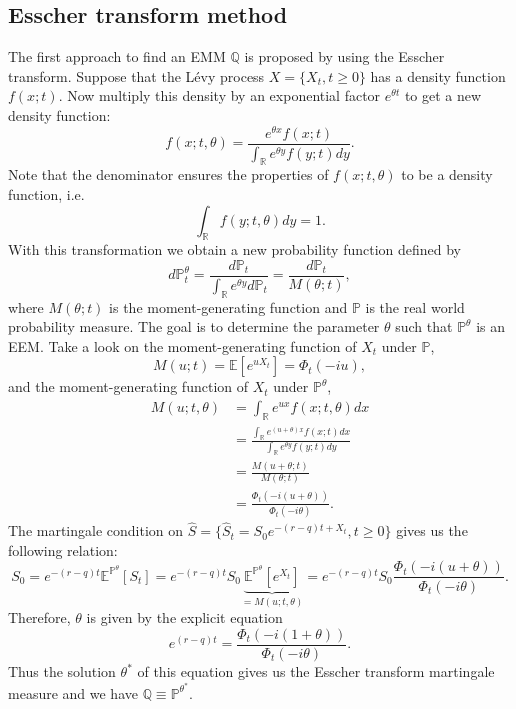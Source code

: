 \subsection{Esscher transform method}
The first approach to find an EMM $\mathbb{Q}$ is proposed by \citeauthor{G+94} \citeyearpar{G+94} using the Esscher transform. Suppose that the L\'evy process $X=\{X_t,t\geq0\}$ has a density function $f(x;t)$. Now multiply this density by an exponential factor $e^{\theta t}$ to get a new density function:
$$f(x;t,\theta) = \frac{e^{\theta x}f(x;t)}{\int_{\mathbb{R}}e^{\theta y}f(y;t)dy}.$$
Note that the denominator ensures the properties of $f(x;t,\theta)$ to be a density function, i.e.
$$\int_\mathbb{R}f(y;t,\theta)dy = 1.$$
With this transformation we obtain a new probability function defined by
$$d\mathbb{P}^{\theta}_t = \frac{d\mathbb{P}_t}{\int_\mathbb{R}e^{\theta y} d\mathbb{P}_t} = \frac{d\mathbb{P}_t}{M(\theta;t)},$$
where $M(\theta;t)$ is the moment-generating function and $\mathbb{P}$ is the real world probability measure. The goal is to determine the parameter $\theta$ such that $\mathbb{P}^{\theta}$ is an EEM.
Take a look on the moment-generating function of $X_t$ under $\mathbb{P}$,
$$M(u;t) = \mathbb{E}\left[e^{u X_t}\right]=\Phi_t(-iu),$$
and the moment-generating function of $X_t$ under $\mathbb{P}^{\theta}$,
\begin{align}\label{eq:CF_theta}
M(u;t,\theta) &= \int_\mathbb{R} e^{u x}f(x;t,\theta)dx\nonumber\\
&=\frac{\int_\mathbb{R} e^{(u+\theta)x}f(x;t) dx}{\int_\mathbb{R} e^{\theta y}f(y;t)dy}\nonumber\\
&= \frac{M(u+\theta;t)}{M(\theta;t)}\nonumber\\
&=\frac{\Phi_t(-i(u+\theta))}{\Phi_t(-i\theta)}.
\end{align}
The martingale condition on $\hat{S}=\{\hat{S}_t=S_0e^{-(r-q)t+X_t},t\geq0\}$ gives us the following relation:
$$S_0 = e^{-(r-q)t}\mathbb{E}^{\mathbb{P}^\theta}\left[S_t\right]=e^{-(r-q)t}S_0\underbrace{\mathbb{E}^{\mathbb{P}^\theta}\left[e^{X_t}\right]}_{=M(u;t,\theta)}=e^{-(r-q)t}S_0 \frac{\Phi_t(-i(u+\theta))}{\Phi_t(-i\theta)}.$$
Therefore, $\theta$ is given by the explicit equation
$$ e^{(r-q)t}= \frac{\Phi_t(-i(1+\theta))}{\Phi_t(-i\theta)}.$$
Thus the solution $\theta^\ast$ of this equation gives us the Esscher transform martingale measure and we have $\mathbb{Q} \equiv \mathbb{P}^{\theta^\ast}$.


